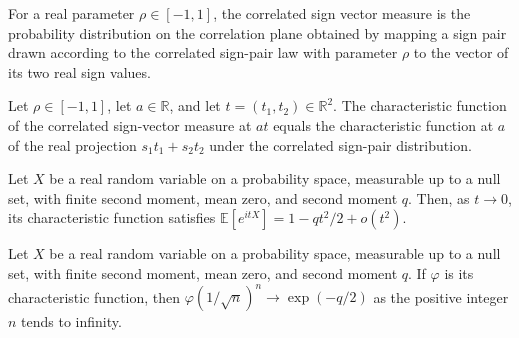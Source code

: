 \begin{definition}
\label{FABL.correlatedSignVectorMeasure}
\leanok
{}
For a real parameter $\rho\in[-1,1]$, the correlated sign vector measure is the
probability distribution on the correlation plane obtained by mapping a sign pair drawn
according to the correlated sign-pair law with parameter $\rho$ to the vector of its two
real sign values.
\end{definition}

\begin{theorem}
\label{FABL.charFun_correlatedSignVectorMeasure_smul}
\leanok
{}
Let $\rho\in[-1,1]$, let $a\in\mathbb R$, and let $t=(t_1,t_2)\in\mathbb R^2$. The
characteristic function of the correlated sign-vector measure at $at$ equals the
characteristic function at $a$ of the real projection $s_1t_1+s_2t_2$ under the
correlated sign-pair distribution.
\end{theorem}

\begin{theorem}
\label{FABL.taylor_charFun_two_of_secondMoment}
\leanok
{}
Let $X$ be a real random variable on a probability space, measurable up to a null set,
with finite second moment, mean zero, and second moment $q$. Then, as $t\to0$, its
characteristic function satisfies $\mathbb{E}[e^{itX}]=1-qt^2/2+o(t^2)$.
\end{theorem}

\begin{theorem}
\label{FABL.tendsto_charFun_inv_sqrt_mul_pow_of_secondMoment}
\leanok
{}
Let $X$ be a real random variable on a probability space, measurable up to a null set,
with finite second moment, mean zero, and second moment $q$. If $\varphi$ is its
characteristic function, then $\varphi(1/\sqrt{n})^n\to\exp(-q/2)$ as the positive
integer $n$ tends to infinity.
\end{theorem}

